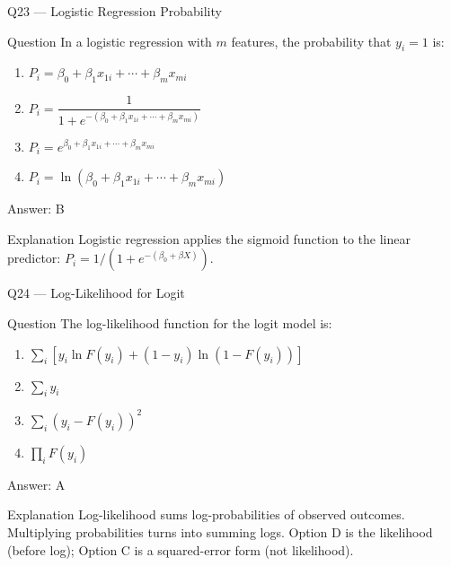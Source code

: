 \documentclass[aspectratio=169,8pt]{beamer}
\begin{document}
	\begin{frame}{Q23 --- Logistic Regression Probability}
		\begin{block}{Question}
			In a logistic regression with $m$ features, the probability that $y_i = 1$ is:
			\begin{enumerate}
				\item $P_i = \beta_0 + \beta_1 x_{1i} + \cdots + \beta_m x_{mi}$
				\item $P_i = \dfrac{1}{1 + e^{-(\beta_0 + \beta_1 x_{1i} + \cdots + \beta_m x_{mi})}}$
				\item $P_i = e^{\beta_0 + \beta_1 x_{1i} + \cdots + \beta_m x_{mi}}$
				\item $P_i = \ln(\beta_0 + \beta_1 x_{1i} + \cdots + \beta_m x_{mi})$
			\end{enumerate}
		\end{block}
		\begin{exampleblock}{Answer: B}\end{exampleblock}
		\begin{block}{Explanation}
			Logistic regression applies the sigmoid function to the linear predictor: $P_i = 1/(1 + e^{-(\beta_0 + \beta X)})$.
		\end{block}
	\end{frame}
	
	\begin{frame}{Q24 --- Log-Likelihood for Logit}
		\begin{block}{Question}
			The log-likelihood function for the logit model is:
			\begin{enumerate}
				\item $\sum_i [y_i \ln F(y_i) + (1 - y_i) \ln(1 - F(y_i))]$
				\item $\sum_i y_i$
				\item $\sum_i (y_i - F(y_i))^2$
				\item $\prod_i F(y_i)$
			\end{enumerate}
		\end{block}
		\begin{exampleblock}{Answer: A}\end{exampleblock}
		\begin{block}{Explanation}
			Log-likelihood sums log-probabilities of observed outcomes. Multiplying probabilities turns into summing logs. Option D is the likelihood (before log); Option C is a squared-error form (not likelihood).
		\end{block}
	\end{frame}
	
\end{document}
